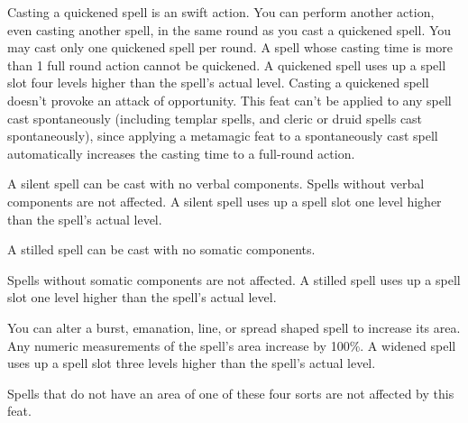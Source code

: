 {Casting a quickened spell is an swift action. You can perform another action, even casting another spell, in the same round as you cast a quickened spell. You may cast only one quickened spell per round. A spell whose casting time is more than 1 full round action cannot be quickened. A quickened spell uses up a spell slot four levels higher than the spell’s actual level. Casting a quickened spell doesn’t provoke an attack of opportunity.}
{}
{This feat can’t be applied to any spell cast spontaneously (including templar spells, and cleric or druid spells cast spontaneously), since applying a metamagic feat to a spontaneously cast spell automatically increases the casting time to a full-round action.}

{A silent spell can be cast with no verbal components. Spells without verbal components are not affected. A silent spell uses up a spell slot one level higher than the spell’s actual level.}

{A stilled spell can be cast with no somatic components.

Spells without somatic components are not affected. A stilled spell uses up a spell slot one level higher than the spell’s actual level.}

{You can alter a burst, emanation, line, or spread shaped spell to increase its area. Any numeric measurements of the spell’s area increase by 100\%. A widened spell uses up a spell slot three levels higher than the spell’s actual level.

Spells that do not have an area of one of these four sorts are not affected by this feat.}
